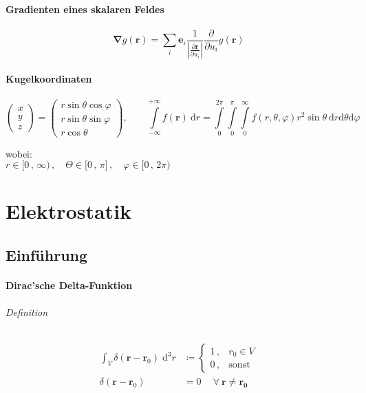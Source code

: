 \documentclass[titlepage,11pt,a4paper,ngerman]{report}
\newcommand{\prt}[2]{\frac{\partial #1}{\partial #2}}
\renewcommand{\vec}[1]{\boldsymbol{#1}}
\newcommand{\vabla}{\boldsymbol{\nabla}}
\renewcommand{\paragraph}[1]{\subsubsection{#1}}
\begin{document}
\paragraph{Gradienten eines skalaren Feldes}
$$\vabla g(\vec{r}) = \sum_i \vec{e}_i \frac{1}{\left|\prt{\vec{r}}{u_i}\right|}\prt{}{u_i}g(\vec{r})$$

\paragraph{Kugelkoordinaten}
$$
\begin{pmatrix}
	x \\ y\\ z
\end{pmatrix}
=
\begin{pmatrix}
	r \sin \theta \cos \varphi\\
	r \sin \theta \sin \varphi\\
	r \cos \theta
\end{pmatrix}
, \qquad \int\limits_{-\infty}^{+\infty} f(\vec{r})\ \textrm{d}r = \int\limits_{0}^{2 \pi} \int\limits_{0}^{\pi} \int\limits_{0}^{\infty} f(r,\theta,\varphi) r^2 \sin \theta\ \textrm{d}r \textrm{d}\theta \textrm{d}\varphi
$$

wobei:\\
$r\in \lbrack0\, ,\,\infty)\, ,\quad \Theta\in\lbrack 0\, ,\, \pi\rbrack\, , \quad \varphi\in\lbrack 0\, ,\, 2\pi) $


\chapter{Elektrostatik}

\section{Einführung}
\paragraph{Dirac'sche Delta-Funktion}
\subparagraph{Definition}

\begin{align*}
\int_{V} \delta(\vec{r}-\vec{r}_0) \; \text{d}^3r &\coloneqq
	\begin{cases} 
		1 \, , & r_0 \in V \\
		0 \, , & \text{sonst}
	\end{cases} \\
\delta(\vec{r}-\vec{r}_0) &= 0 \quad \ \forall \: \vec{r} \neq \vec{r_0}
\end{align*}
\end{document}
